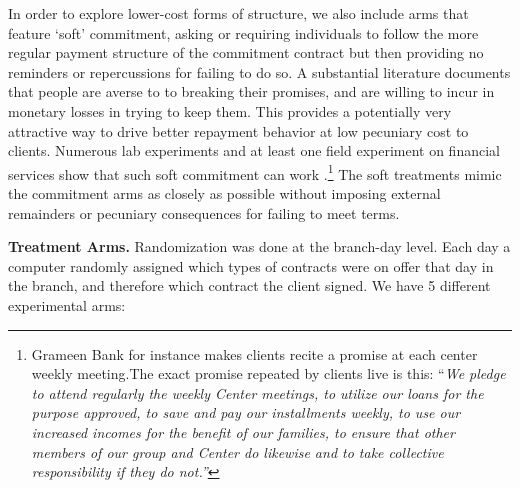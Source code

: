 \documentclass[oneside,11pt]{article}
\begin{document}
In order to explore lower-cost forms of structure, we also include arms that feature `soft' commitment, asking or requiring individuals to follow the more regular payment structure of the commitment contract but then providing no reminders or repercussions for failing to do so.  A substantial literature documents that people are averse to to breaking their promises, and are willing to incur in monetary losses in trying to keep them. This provides a potentially very attractive way to drive better repayment behavior at low pecuniary cost to clients.  Numerous lab experiments and at least one field experiment on financial services show that such soft commitment can work \citep{Craig}.\footnote{Grameen Bank for instance makes clients recite a promise at each center weekly meeting.The exact promise repeated by clients live is this: ``\textit{We pledge to attend regularly the weekly Center meetings, to utilize our loans for the purpose approved, to save and pay our installments weekly, to use our increased incomes for the benefit of our families, to ensure that other members of our group and Center do likewise and to take collective responsibility if they do not.''}}  The soft treatments mimic the commitment arms as closely as possible without imposing external remainders or pecuniary consequences for failing to meet terms.

\vspace{.2in}
\noindent \textbf{Treatment Arms.} Randomization was done at the branch-day level. Each day a computer randomly assigned which types of contracts were on offer that day in the branch, and therefore which contract the client signed.  We have 5 different experimental arms: 
\end{document}
